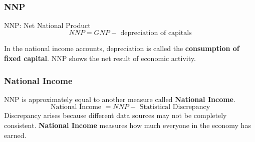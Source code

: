 \documentclass[12pt]{article}
\begin{document}
\noindent{}\\



\subsubsection{NNP}
NNP: Net National Product
\begin{equation*}
NNP = GNP - \text{ depreciation of capitals}
\end{equation*}

In the national income accounts, depreciation is called the {\textbf {consumption
of fixed capital}}.
NNP shows the net result of economic activity.

\subsubsection{National Income}
NNP is approximately equal to another measure called {\textbf {National Income}}.
\begin{equation*}
\text{ National Income } = NNP - \text{ Statistical Discrepancy }
\end{equation*}
 Discrepancy arises because different data sources may not be completely consistent.
{\textbf {National Income}} measures how much everyone in the economy has earned.


\begin{figure}[H]
\end{figure}
\end{document}
